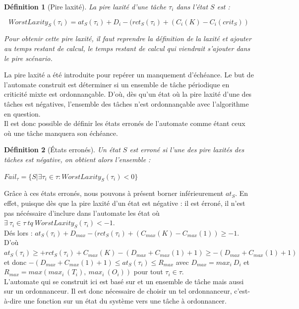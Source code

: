 \documentclass[12pt,a4paper,oneside]{book}
\theoremstyle{break}
\newtheorem{defin}{Définition}[chapter]
\theoremstyle{breakplain}
\begin{document}
\begin{defin}[Pire laxité]
\label{per:worstlaxity}
La pire laxité d'une tâche $\tau_i$ dans l'état $S$ est :

$$
WorstLaxity_S(\tau_i) = at_S(\tau_i) + D_i - (rct_S(\tau_i) + (C_i(K)-C_i(crit_S))
$$

Pour obtenir cette pire laxité, il faut reprendre la définition de la laxité et ajouter au temps restant de calcul, le temps restant de calcul qui viendrait s'ajouter dans le pire scénario.
\end{defin}

La pire laxité a été introduite pour repérer un manquement d'échéance. Le but de l'automate construit est déterminer si un ensemble de tâche périodique en criticité mixte est ordonnançable. D'où, dès qu'un état où la pire laxité d'une des tâches est négatives, l'ensemble des tâches n'est ordonnançable avec l'algorithme en question.\\
Il est donc possible de définir les états erronés de l'automate comme étant ceux où une tâche manquera son échéance.

\begin{defin}[États erronés]
Un état $S$ est erroné si l'une des pire laxités des tâches est négative, on obtient alors l'ensemble :

$Fail_\tau = \{S|\exists \tau_i \in \tau : WorstLaxity_S(\tau_i) < 0  \}$\\
\end{defin}

Grâce à ces états erronés, nous pouvons à présent borner inférieurement $at_S$. En effet, puisque dès que la pire laxité d'un état est négative : il est érroné, il n'est pas nécéssaire d'inclure dans l'automate les état où $\exists\ \tau_i \in \tau\ tq\ WorstLaxity_S(\tau_i) < -1$.\\
Dés lors : $at_S(\tau_i) + D_{max} - (rct_S(\tau_i) + (C_{max}(K)-C_{max}(1)) \geq -1$.\\
D'où $at_S(\tau_i) \geq + rct_S(\tau_i) + C_{max}(K) - (D_{max}+C_{max}(1)+1) \geq - (D_{max}+C_{max}(1)+1)$ et donc $- (D_{max}+C_{max}(1)+1) \leq at_S(\tau_i) \leq R_{max}$ avec $D_{max} = max_i\ D_i$ et $R_{max} = max(max_i\ (T_i),\ max_i\ (O_i))$ pour tout $\tau_i \in \tau$.\\

L'automate qui se construit ici est basé sur et un ensemble de tâche mais aussi sur un ordonnanceur. Il est donc nécessaire de choisir un tel ordonnanceur, c'est-à-dire une fonction sur un état du système vers une tâche à ordonnancer.
\end{document}
